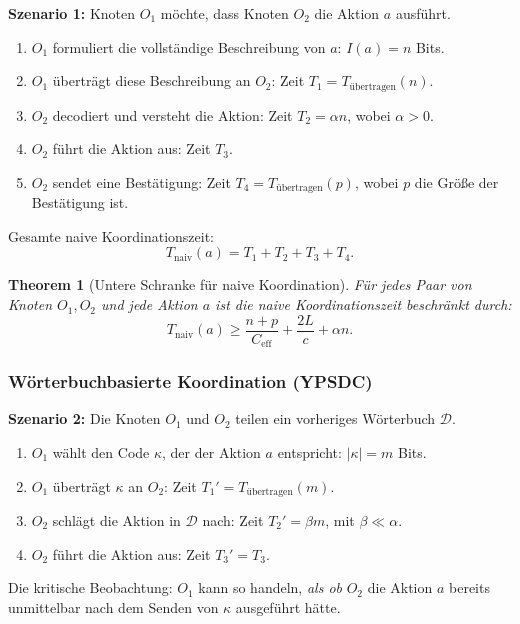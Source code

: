 \documentclass[12pt]{article}
\newtheorem{theorem}{Theorem}
\begin{document}
	\textbf{Szenario 1:} Knoten $O_1$ möchte, dass Knoten $O_2$ die Aktion $a$ ausführt.
	
	\begin{enumerate}
		\item $O_1$ formuliert die vollständige Beschreibung von $a$: $I(a) = n$ Bits.
		\item $O_1$ überträgt diese Beschreibung an $O_2$: Zeit $T_1 = T_{\text{übertragen}}(n)$.
		\item $O_2$ decodiert und versteht die Aktion: Zeit $T_2 = \alpha n$, wobei $\alpha > 0$.
		\item $O_2$ führt die Aktion aus: Zeit $T_3$.
		\item $O_2$ sendet eine Bestätigung: Zeit $T_4 = T_{\text{übertragen}}(p)$, wobei $p$ die Größe der Bestätigung ist.
	\end{enumerate}
	
	Gesamte naive Koordinationszeit:
	\[
	T_{\text{naiv}}(a) = T_1 + T_2 + T_3 + T_4.
	\]
	
	\begin{theorem}[Untere Schranke für naive Koordination]
		\label{thm:naive-lower-bound}
		Für jedes Paar von Knoten $O_1, O_2$ und jede Aktion $a$ ist die naive Koordinationszeit beschränkt durch:
		\[
		T_{\text{naiv}}(a) \geq \frac{n + p}{C_{\text{eff}}} + \frac{2L}{c} + \alpha n.
		\]
	\end{theorem}
	
	\subsubsection{Wörterbuchbasierte Koordination (YPSDC)}
	
	\textbf{Szenario 2:} Die Knoten $O_1$ und $O_2$ teilen ein vorheriges Wörterbuch $\mathcal{D}$.
	
	\begin{enumerate}
		\item $O_1$ wählt den Code $\kappa$, der der Aktion $a$ entspricht: $|\kappa| = m$ Bits.
		\item $O_1$ überträgt $\kappa$ an $O_2$: Zeit $T_1' = T_{\text{übertragen}}(m)$.
		\item $O_2$ schlägt die Aktion in $\mathcal{D}$ nach: Zeit $T_2' = \beta m$, mit $\beta \ll \alpha$.
		\item $O_2$ führt die Aktion aus: Zeit $T_3' = T_3$.
	\end{enumerate}
	
	Die kritische Beobachtung: $O_1$ kann so handeln, \emph{als ob} $O_2$ die Aktion $a$ bereits unmittelbar nach dem Senden von $\kappa$ ausgeführt hätte.
	
\end{document}
